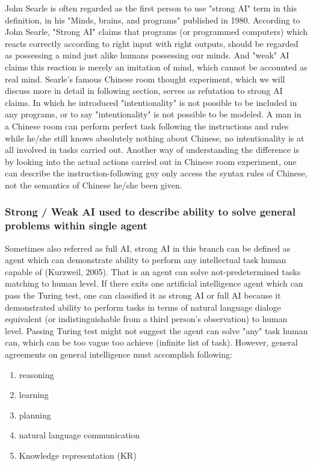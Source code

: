 \documentclass[11pt]{article}
\begin{document}
John Searle is often regarded as the first person to use "strong AI" term in this definition, in his "Minds, brains, and programs" published in 1980. According to John Searle, "Strong AI" claims that programs (or programmed computers) which reacts correctly according to right input with right outputs, should be regarded as possessing a mind just alike humans possessing our minds. And "weak" AI claims this reaction is merely an imitation of mind, which cannot be accounted as real mind. Searle's famous Chinese room thought experiment, which we will discuss more in detail in following section, serves as refutation to strong AI claims. In which he introduced "intentionality" is not possible to be included in any programs, or to say "intentionality" is not possible to be modeled. A man in a Chinese room can perform perfect task following the instructions and rules while he/she still knows absolutely nothing about Chinese, no intentionality is at all involved in tasks carried out. Another way of understanding the difference is by looking into the actual actions carried out in Chinese room experiment, one can describe the instruction-following guy only access the syntax rules of Chinese, not the semantics of Chinese he/she been given.

\subsubsection{Strong / Weak AI used to describe ability to solve general problems within single agent}

Sometimes also referred as full AI, strong AI in this branch can be defined as agent which can demonstrate ability to perform any intellectual task human capable of (Kurzweil, 2005). That is an agent can solve not-predetermined tasks matching to human level. If there exits one artificial intelligence agent which can pass the Turing test, one can classified it as strong AI or full AI because it demonstrated ability to perform tasks in terms of natural language dialoge equivalent (or indistinguishable from a third person's observation) to human level. Passing Turing test might not suggest the agent can solve "any" task human can, which can be too vague too achieve (infinite list of task). However, general agreements on general intelligence must accomplish following:
\begin{enumerate}
\item reasoning
\item learning
\item planning
\item natural language communication
\item Knowledge representation (KR) 
\end{enumerate}
\end{document}
